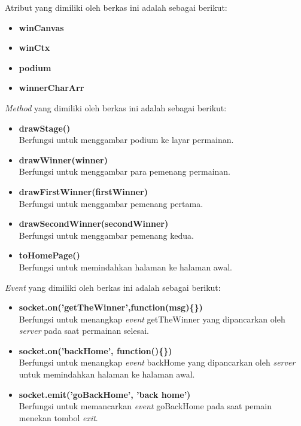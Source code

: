 \begin{enumerate}
\begin{enumerate}
\begin{enumerate}
			Atribut yang dimiliki oleh berkas ini adalah sebagai berikut:
			\begin{itemize}
				\item \textbf{winCanvas}
				\item \textbf{winCtx}
				\item \textbf{podium}
				\item \textbf{winnerCharArr}
			\end{itemize}
			
			\textit{Method} yang dimiliki oleh berkas ini adalah sebagai berikut:
			\begin{itemize}
				\item \textbf{drawStage()} \\
				Berfungsi untuk menggambar podium ke layar permainan.
				
				\item \textbf{drawWinner(winner)} \\
				Berfungsi untuk menggambar para pemenang permainan.
				
				\item \textbf{drawFirstWinner(firstWinner)} \\
				Berfungsi untuk menggambar pemenang pertama.
				
				\item \textbf{drawSecondWinner(secondWinner)} \\
				Berfungsi untuk menggambar pemenang kedua.
				
				\item \textbf{toHomePage()} \\
				Berfungsi untuk memindahkan halaman ke halaman awal.
			\end{itemize}
			
			\textit{Event} yang dimiliki oleh berkas ini adalah sebagai berikut:
			\begin{itemize}
				\item \textbf{socket.on('getTheWinner',function(msg)\{\})} \\
				Berfungsi untuk menangkap \textit{event} getTheWinner yang dipancarkan oleh \textit{server} pada saat permainan selesai.
				
				\item \textbf{socket.on('backHome', function()\{\})}  \\
				Berfungsi untuk menangkap \textit{event} backHome yang dipancarkan oleh \textit{server} untuk memindahkan halaman ke halaman awal.
				
				\item \textbf{socket.emit('goBackHome', 'back home')} \\
				Berfungsi untuk memancarkan \textit{event} goBackHome pada saat pemain menekan tombol \textit{exit}. 
				 

\end{itemize}
\end{enumerate}
\end{enumerate}
\end{enumerate}
